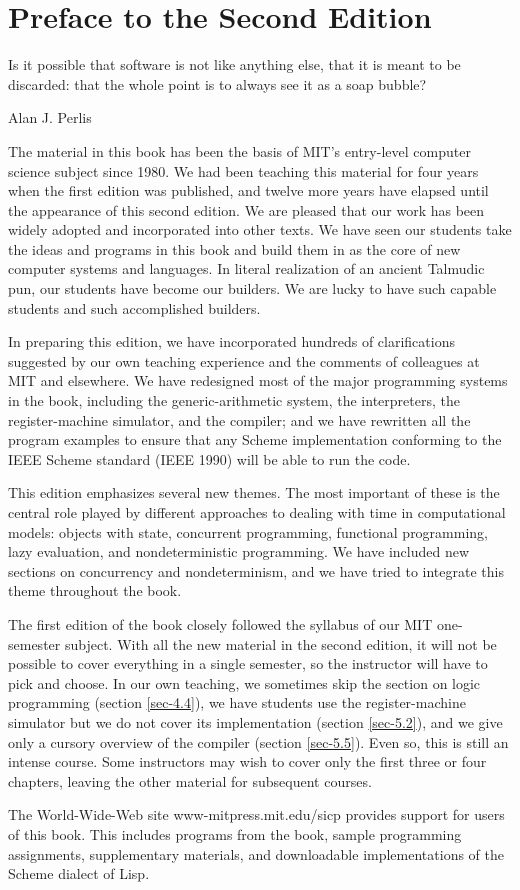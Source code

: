 \chapter{Preface to the Second Edition}

\epigraph{
Is it possible that software is not like anything else, that it
is meant to be discarded: that the whole point is to 
always see it as a soap bubble?}{Alan J. Perlis}

The material in this book has been the basis of MIT's entry-level
computer science subject since 1980.  We had been teaching this
material for four years when the first edition was published, and
twelve more years have elapsed until the appearance of this second
edition.  We are pleased that our work has been widely adopted and
incorporated into other texts.  We have seen our students take the
ideas and programs in this book and build them in as the core of new
computer systems and languages.  In literal realization of an ancient
Talmudic pun, our students have become our builders.  We are lucky to
have such capable students and such accomplished builders.

In preparing this edition, we have incorporated hundreds of 
clarifications suggested by our own teaching experience and the
comments of colleagues at MIT and elsewhere.  We have redesigned
most of the major programming systems in the book, including
the generic-arithmetic system, the interpreters, the register-machine
simulator, and the compiler; and we have rewritten all the program
examples to ensure that any Scheme implementation conforming to
the IEEE Scheme standard (IEEE 1990) will be able to run the code.

This edition emphasizes several new themes.  The most important
of these is the central role played by different approaches to
dealing with time in computational models: objects with state,
concurrent programming, functional programming, lazy evaluation,
and nondeterministic programming.  We have included new sections on 
concurrency and nondeterminism, and we have tried to integrate this
theme throughout the book.

The first edition of the book closely followed the syllabus of our MIT
one-semester subject.  With all the new material in the second
edition, it will not be possible to cover everything in a single
semester, so the instructor will have to pick and choose.  In our own
teaching, we sometimes skip the section on logic programming (section
\ref{sec-4.4}), we have students use the register-machine simulator
but we do not cover its implementation (section \ref{sec-5.2}), and we
give only a cursory overview of the compiler (section \ref{sec-5.5}).
Even so, this is still an intense course.  Some instructors may wish
to cover only the first three or four chapters, leaving the other
material for subsequent courses.

The World-Wide-Web site www-mitpress.mit.edu/sicp %
provides support for users of this book.
This includes programs from the book,
sample programming assignments, supplementary materials,
and downloadable implementations of the Scheme dialect of Lisp.

